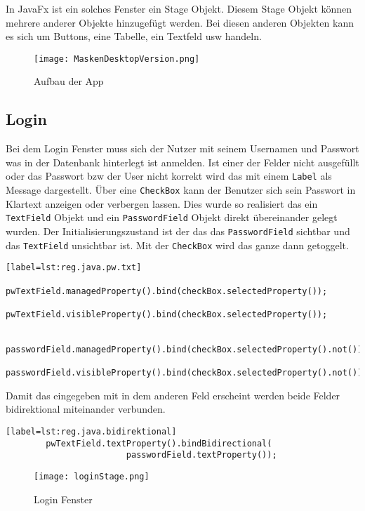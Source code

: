In JavaFx ist ein solches Fenster ein Stage Objekt. Diesem Stage Objekt können mehrere anderer Objekte hinzugefügt werden. Bei diesen anderen Objekten kann es sich um Buttons, eine Tabelle, ein Textfeld usw handeln.

\begin{figure}[h]
  \begin{center}
    \texttt{[image: MaskenDesktopVersion.png]}
  		  \caption{Aufbau der App}
     \label{fig.MaskenDesktopVersion}
  \end{center}
\end{figure}\newpage

\subsection{Login}
\label{subsec.login}
Bei dem Login Fenster muss sich der Nutzer mit seinem Usernamen und Passwort was in der Datenbank hinterlegt ist anmelden. Ist einer der Felder nicht ausgefüllt oder das Passwort bzw der User nicht korrekt wird das mit einem \texttt{Label} als Message dargestellt. Über eine \texttt{CheckBox} kann der Benutzer sich sein Passwort in Klartext anzeigen oder verbergen lassen. Dies wurde so realisiert das ein \texttt{TextField} Objekt und ein \texttt{PasswordField} Objekt direkt übereinander gelegt wurden. Der Initialisierungszustand ist der das das \texttt{PasswordField} sichtbar und das \texttt{TextField} unsichtbar ist. Mit der \texttt{CheckBox} wird das ganze dann getoggelt.
\begin{lstlisting}[caption={Java Passwort-, Textfeld Un-, Sichtbar},captionpos=b][label=lst:reg.java.pw.txt]
		pwTextField.managedProperty().bind(checkBox.selectedProperty());
		pwTextField.visibleProperty().bind(checkBox.selectedProperty());

		passwordField.managedProperty().bind(checkBox.selectedProperty().not());
		passwordField.visibleProperty().bind(checkBox.selectedProperty().not());
\end{lstlisting}

Damit das eingegeben mit in dem anderen Feld erscheint werden beide Felder bidirektional miteinander verbunden.
\begin{lstlisting}[caption={Java Passwort-, Textfeld bidirektional},captionpos=b][label=lst:reg.java.bidirektional]
		pwTextField.textProperty().bindBidirectional(
						passwordField.textProperty());
\end{lstlisting}
\begin{figure}[h]
  \begin{center}
    \texttt{[image: loginStage.png]}
  		  \caption{Login Fenster}
     \label{fig.loginFenster}
  \end{center}
\end{figure}

